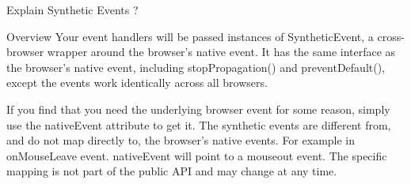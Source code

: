 Explain Synthetic Events ?

Overview
Your event handlers will be passed instances of SyntheticEvent, a 
cross-browser wrapper around the browser’s native event. 
It has the same interface as the browser’s native event, 
including stopPropagation() and preventDefault(), except the events 
work identically across all browsers.

If you find that you need the underlying browser event for 
some reason, simply use the nativeEvent attribute to get it. 
The synthetic events are different from, and do not map directly 
to, the browser’s native events. For example in onMouseLeave event.
nativeEvent will point to a mouseout event. The specific mapping is 
not part of the public API and may change at any time. 

